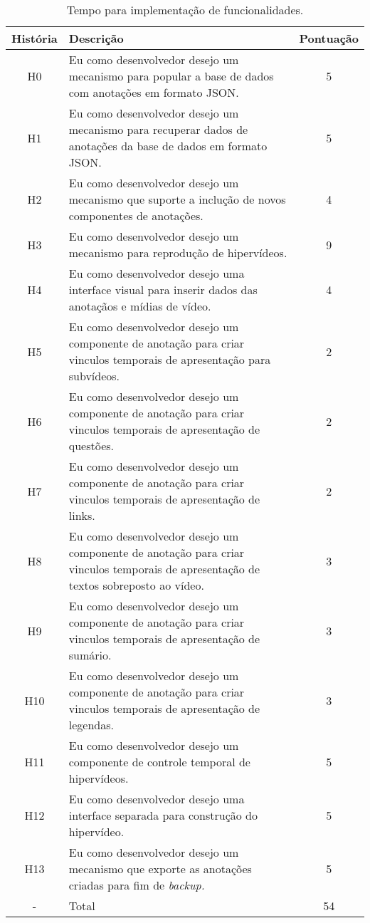 \begin{table}[h!]
	\centering
	\begin{tabular}{| c | p{9cm} | c |}
		\hline
		História & Descrição & Pontuação \\
		\hline
		\hline
		H0 & Eu como desenvolvedor desejo um mecanismo para popular a base de dados com anotações em formato JSON. & 5 \\
		\hline
		H1 & Eu como desenvolvedor desejo um mecanismo para recuperar dados de anotações da base de dados em formato JSON. & 5 \\
		\hline
		H2 & Eu como desenvolvedor desejo um mecanismo que suporte a inclução de novos componentes de anotações. & 4 \\
		\hline
		H3 & Eu como desenvolvedor desejo um mecanismo para reprodução de hipervídeos. & 9 \\
		\hline		
		H4 & Eu como desenvolvedor desejo uma interface visual para inserir dados das anotaçãos e mídias de vídeo. & 4 \\
		\hline
		H5 & Eu como desenvolvedor desejo um componente de anotação para criar vinculos temporais de apresentação para subvídeos. & 2 \\
		\hline
		H6 & Eu como desenvolvedor desejo um componente de anotação para criar vinculos temporais de apresentação de questões. & 2 \\
		\hline		
		H7 & Eu como desenvolvedor desejo um componente de anotação para criar vinculos temporais de apresentação de links. & 2 \\
		\hline
		H8 & Eu como desenvolvedor desejo um componente de anotação para criar vinculos temporais de apresentação de textos sobreposto ao vídeo. & 3 \\
		\hline
		H9 & Eu como desenvolvedor desejo um componente de anotação para criar vinculos temporais de apresentação de sumário. & 3 \\
		\hline
		H10 & Eu como desenvolvedor desejo um componente de anotação para criar vinculos temporais de apresentação de legendas. & 3 \\
		\hline		
		H11 & Eu como desenvolvedor desejo um componente de controle temporal de hipervídeos. & 5 \\
		\hline
		H12 & Eu como desenvolvedor desejo uma interface separada para construção do hipervídeo. & 5 \\
		\hline
		H13 & Eu como desenvolvedor desejo um mecanismo que exporte as anotações criadas para fim de \textit{backup.} & 5 \\
		\hline
		\hline		
		- & Total & 54 \\
		\hline		
	\end{tabular}
	\caption{Tempo para implementação de funcionalidades.}
	\label{tab:tempo}
\end{table}

